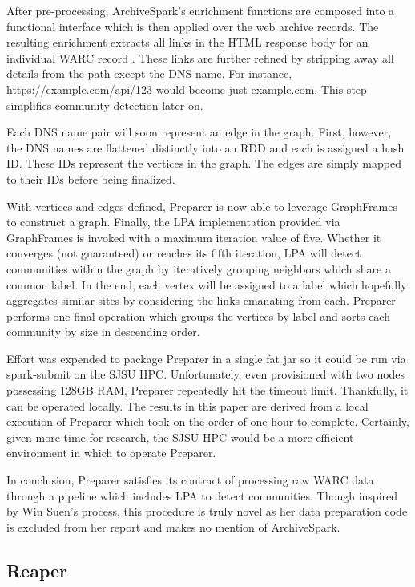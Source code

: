 \documentclass[conference]{IEEEtran}
\begin{document}
After pre-processing, ArchiveSpark's enrichment functions \cite{enrichmentFunctions} are composed into a functional interface which is then applied over the web archive records. The resulting enrichment extracts all links in the HTML response body for an individual WARC record \cite{linkExtraction}. These links are further refined by stripping away all details from the path except the DNS name. For instance, https://example.com/api/123 would become just example.com. This step simplifies community detection later on.

Each DNS name pair will soon represent an edge in the graph. First, however, the DNS names are flattened distinctly into an RDD and each is assigned a hash ID. These IDs represent the vertices in the graph. The edges are simply mapped to their IDs before being finalized.

With vertices and edges defined, Preparer is now able to leverage GraphFrames to construct a graph. Finally, the LPA implementation provided via GraphFrames is invoked with a maximum iteration value of five. Whether it converges (not guaranteed) or reaches its fifth iteration, LPA will detect communities within the graph by iteratively grouping neighbors which share a common label. In the end, each vertex will be assigned to a label which hopefully aggregates similar sites by considering the links emanating from each. Preparer performs one final operation which groups the vertices by label and sorts each community by size in descending order.

Effort was expended to package Preparer in a single fat jar so it could be run via spark-submit on the SJSU HPC. Unfortunately, even provisioned with two nodes possessing 128GB RAM, Preparer repeatedly hit the timeout limit. Thankfully, it can be operated locally. The results in this paper are derived from a local execution of Preparer which took on the order of one hour to complete. Certainly, given more time for research, the SJSU HPC would be a more efficient environment in which to operate Preparer.

In conclusion, Preparer satisfies its contract of processing raw WARC data through a pipeline which includes LPA to detect communities. Though inspired by Win Suen's process, this procedure is truly novel as her data preparation code is excluded from her report and makes no mention of ArchiveSpark.

\subsection{Reaper}
\end{document}
